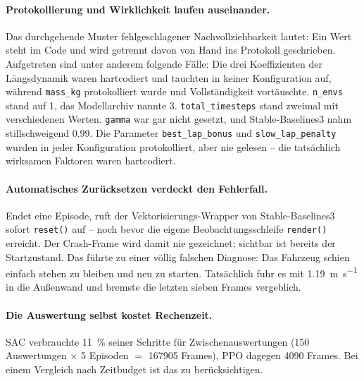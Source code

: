 \paragraph{Protokollierung und Wirklichkeit laufen auseinander.}
Das durchgehende Muster fehlgeschlagener Nachvollziehbarkeit lautet: Ein Wert steht im Code und wird getrennt davon von Hand ins Protokoll geschrieben. Aufgetreten sind unter anderem folgende Fälle: Die drei Koeffizienten der Längsdynamik waren hartcodiert und tauchten in keiner Konfiguration auf, während \texttt{mass\_kg} protokolliert wurde und Vollständigkeit vortäuschte. \texttt{n\_envs} stand auf \num{1}, das Modellarchiv nannte \num{3}. \texttt{total\_timesteps} stand zweimal mit verschiedenen Werten. \texttt{gamma} war gar nicht gesetzt, und Stable-Baselines3 nahm stillschweigend \num{0.99}. Die Parameter \texttt{best\_lap\_bonus} und \texttt{slow\_lap\_penalty} wurden in jeder Konfiguration protokolliert, aber nie gelesen -- die tatsächlich wirksamen Faktoren waren hartcodiert.

\paragraph{Automatisches Zurücksetzen verdeckt den Fehlerfall.}
Endet eine Episode, ruft der Vektorisierungs-Wrapper von Stable-Baselines3 sofort \texttt{reset()} auf -- noch bevor die eigene Beobachtungsschleife \texttt{render()} erreicht. Der Crash-Frame wird damit nie gezeichnet; sichtbar ist bereits der Startzustand. Das führte zu einer völlig falschen Diagnose: Das Fahrzeug schien einfach stehen zu bleiben und neu zu starten. Tatsächlich fuhr es mit \SI{1.19}{\meter\per\second} in die Außenwand und bremste die letzten sieben Frames vergeblich.

\paragraph{Die Auswertung selbst kostet Rechenzeit.}
\ac{SAC} verbrauchte \SI{11}{\percent} seiner Schritte für Zwischenauswertungen (\num{150} Auswertungen $\times$ \num{5} Episoden $=$ \num{167905} Frames), \ac{PPO} dagegen \num{4090} Frames. Bei einem Vergleich nach Zeitbudget ist das zu berücksichtigen.
